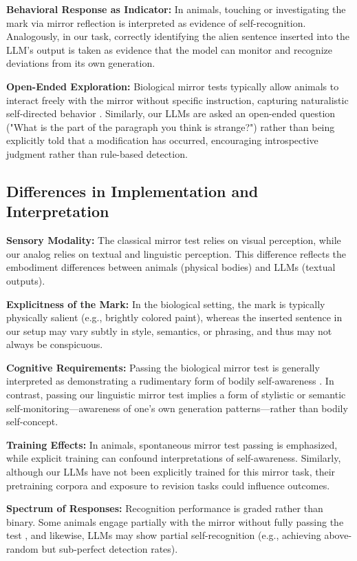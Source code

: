 \documentclass{article}
\begin{document}
\textbf{Behavioral Response as Indicator:}  
In animals, touching or investigating the mark via mirror reflection is interpreted as evidence of self-recognition. Analogously, in our task, correctly identifying the alien sentence inserted into the LLM's output is taken as evidence that the model can monitor and recognize deviations from its own generation.

\textbf{Open-Ended Exploration:}  
Biological mirror tests typically allow animals to interact freely with the mirror without specific instruction, capturing naturalistic self-directed behavior \citep{bekoff2023smart}. Similarly, our LLMs are asked an open-ended question ("What is the part of the paragraph you think is strange?") rather than being explicitly told that a modification has occurred, encouraging introspective judgment rather than rule-based detection.

\subsection{Differences in Implementation and Interpretation}

\textbf{Sensory Modality:}  
The classical mirror test relies on visual perception, while our analog relies on textual and linguistic perception. This difference reflects the embodiment differences between animals (physical bodies) and LLMs (textual outputs).

\textbf{Explicitness of the Mark:}  
In the biological setting, the mark is typically physically salient (e.g., brightly colored paint), whereas the inserted sentence in our setup may vary subtly in style, semantics, or phrasing, and thus may not always be conspicuous.

\textbf{Cognitive Requirements:}  
Passing the biological mirror test is generally interpreted as demonstrating a rudimentary form of bodily self-awareness \citep{rochatsocial1995}. In contrast, passing our linguistic mirror test implies a form of stylistic or semantic self-monitoring—awareness of one’s own generation patterns—rather than bodily self-concept.

\textbf{Training Effects:}  
In animals, spontaneous mirror test passing is emphasized, while explicit training can confound interpretations of self-awareness. Similarly, although our LLMs have not been explicitly trained for this mirror task, their pretraining corpora and exposure to revision tasks could influence outcomes.

\textbf{Spectrum of Responses:}  
Recognition performance is graded rather than binary. Some animals engage partially with the mirror without fully passing the test \citep{reiss2001mirror}, and likewise, LLMs may show partial self-recognition (e.g., achieving above-random but sub-perfect detection rates).
\end{document}
